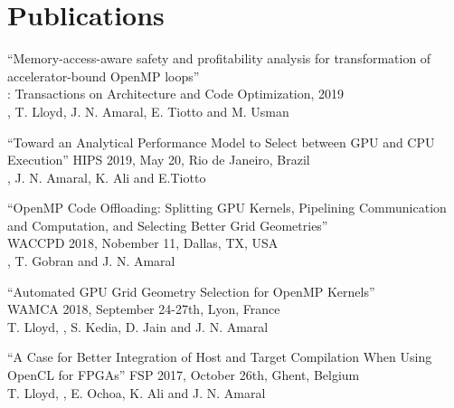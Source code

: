 \documentclass[]{twocol-resume}
\begin{document}
\begin{minipage}[t]{0.66\textwidth}
\section{Publications}
\vspace{\topsep} %
\begin{tightemize}
\item``Memory-access-aware safety and profitability analysis for transformation of
\\\hspace{-3mm}accelerator-bound OpenMP loops''
\\\hspace{-3mm}: Transactions on Architecture and Code
Optimization, 2019
\\\hspace{-3mm}, T. Lloyd,  J. N. Amaral, E. Tiotto and M.
Usman
\item``Toward an Analytical Performance Model to Select between GPU and CPU
\\\hspace{-3mm}Execution'' HIPS 2019, May 20, Rio de Janeiro, Brazil
\\\hspace{-3mm}, J. N. Amaral, K. Ali and E.Tiotto
\item``OpenMP Code Offloading: Splitting GPU Kernels, Pipelining Communication
\\\hspace{-3mm}and Computation, and Selecting Better Grid Geometries''
\\\hspace{-3mm}WACCPD 2018, Nobember 11, Dallas, TX, USA
\\\hspace{-3mm}, T. Gobran and J. N. Amaral
\item``Automated GPU Grid Geometry Selection for OpenMP Kernels''
\\\hspace{-3mm}WAMCA 2018, September 24-27th, Lyon, France
\\\hspace{-3mm}T. Lloyd, , S. Kedia, D. Jain and J. N. Amaral
\item``A Case for Better Integration of Host and Target Compilation When
Using \\\hspace{-3mm}OpenCL for FPGAs'' FSP 2017, October 26th, Ghent, Belgium
\\\hspace{-3mm}T. Lloyd, , E. Ochoa, K. Ali and J. N. Amaral
\end{tightemize}
\vspace*{-2mm}
\sectionseptiny
\end{minipage}
\end{document}
